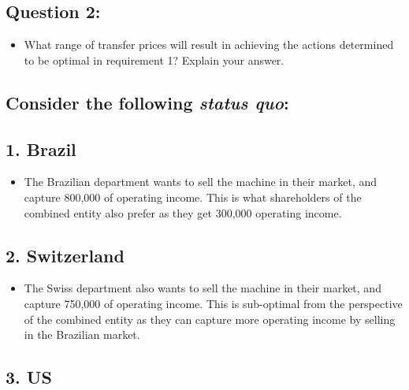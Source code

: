 \hypertarget{question-2}{%
\subsection{Question 2:}\label{question-2}}

\begin{itemize}
\tightlist
\item
  What range of transfer prices will result in achieving the actions
  determined to be optimal in requirement 1? Explain your answer.
\end{itemize}

\hypertarget{consider-the-following-status-quo}{%
\subsection{\texorpdfstring{Consider the following \emph{status
quo}:}{Consider the following status quo:}}\label{consider-the-following-status-quo}}

\hypertarget{brazil}{%
\subsection{1. Brazil}\label{brazil}}

\begin{itemize}
\tightlist
\item
  The Brazilian department wants to sell the machine in their market,
  and capture 800,000 of operating income. This is what shareholders of
  the combined entity also prefer as they get 300,000 operating income.
\end{itemize}

\hypertarget{switzerland}{%
\subsection{2. Switzerland}\label{switzerland}}

\begin{itemize}
\tightlist
\item
  The Swiss department also wants to sell the machine in their market,
  and capture 750,000 of operating income. This is sub-optimal from the
  perspective of the combined entity as they can capture more operating
  income by selling in the Brazilian market.
\end{itemize}

\hypertarget{us}{%
\subsection{3. US}\label{us}}

